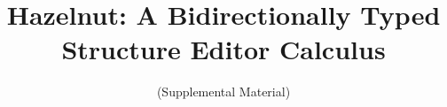 \documentclass{llncs}
\begin{document}
%
\frontmatter          %

\mainmatter              %
%
\title{Hazelnut: A Bidirectionally Typed \\ Structure Editor Calculus}
\subtitle{(Supplemental Material)}
%
%
\author{~}
%
\authorrunning{~} %
%
%
\institute{~
}



\maketitle              %


\end{document}

